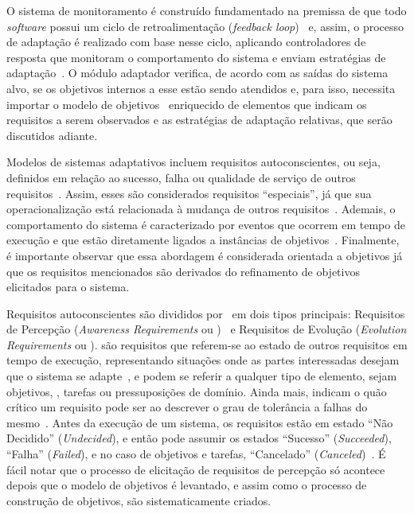 O sistema de monitoramento é construído fundamentado na premissa de que todo \textit{software} possui um ciclo de retroalimentação (\textit{feedback loop})~\cite{brun2009engineering} e, assim, o processo de adaptação é realizado com base nesse ciclo, aplicando controladores de resposta que monitoram o comportamento do sistema e enviam estratégias de adaptação~\cite{souza2013awareness}. O módulo adaptador verifica, de acordo com as saídas do sistema alvo, se os objetivos internos a esse estão sendo atendidos e, para isso, necessita importar o modelo de objetivos~\cite{souza2013awareness} enriquecido de elementos que indicam os requisitos a serem observados e as estratégias de adaptação relativas, que serão discutidos adiante.

Modelos de sistemas adaptativos incluem requisitos autoconscientes, ou seja, definidos em relação ao sucesso, falha ou qualidade de serviço de outros requisitos~\cite{souza2013awareness}. Assim, esses são considerados requisitos ``especiais'', já que sua operacionalização está relacionada à mudança de outros requisitos~\cite{souza2012requirement}. Ademais, o comportamento do sistema é caracterizado por eventos que ocorrem em tempo de execução e que estão diretamente ligados a instâncias de objetivos~\cite{dalpiaz2013runtime}. Finalmente, é importante observar que essa abordagem é considerada orientada a objetivos já que os requisitos mencionados são derivados do refinamento de objetivos elicitados para o sistema.

Requisitos autoconscientes são divididos por~ em dois tipos principais: Requisitos de Percepção (\textit{Awareness Requirements} ou \awreqs)~\cite{souza2013awareness} e Requisitos de Evolução (\textit{Evolution Requirements} ou \evoreqs). \awreqs são requisitos que referem-se ao estado de outros requisitos em tempo de execução, representando situações onde as partes interessadas desejam que o sistema se adapte~\cite{souza2012requirement}, e podem se referir a qualquer tipo de elemento, sejam objetivos, \sofgoals, tarefas ou pressuposições de domínio. Ainda mais, \awreqs indicam o quão crítico um requisito pode ser ao descrever o grau de tolerância a falhas do mesmo~\cite{souza2012requirement}. Antes da execução de um sistema, os requisitos estão em estado ``Não Decidido'' (\textit{Undecided}), e então pode assumir os estados ``Sucesso'' (\textit{Succeeded}), ``Falha'' (\textit{Failed}), e no caso de objetivos e tarefas, ``Cancelado'' (\textit{Canceled})~\cite{souza2013awareness}. É fácil notar que o processo de elicitação de requisitos de percepção só acontece depois que o modelo de objetivos é levantado, e assim como o processo de construção de objetivos, \awreqs são sistematicamente criados.

